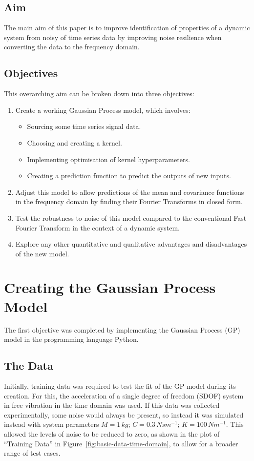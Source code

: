 \documentclass[12pt]{article}
\begin{document}
    \subsection{Aim}
    The main aim of this paper is to improve identification of properties of a dynamic system from noisy of time series data by improving noise resilience when converting the data to the frequency domain.

    \subsection{Objectives}
    This overarching aim can be broken down into three objectives:
        \begin{enumerate}
            \item Create a working Gaussian Process model, which involves:
                \begin{itemize}
                    \item Sourcing some time series signal data.
                    \item Choosing and creating a kernel.
                    \item Implementing optimisation of kernel hyperparameters. \label{item:nll}
                    \item Creating a prediction function to predict the outputs of new inputs. \label{item:predict}
                \end{itemize}
            \item Adjust this model to allow predictions of the mean and covariance functions in the frequency domain by finding their Fourier Transforms in closed form. \label{item:FT}
            \item Test the robustness to noise of this model compared to the conventional Fast Fourier Transform in the context of a dynamic system. \label{noise-resilience}
            \item Explore any other quantitative and qualitative advantages and disadvantages of the new model.
        \end{enumerate}

    \section{Creating the Gaussian Process Model}
    The first objective was completed by implementing the Gaussian Process (GP) model in the programming language Python.
    \subsection{The Data}
    Initially, training data was required to test the fit of the GP model during its creation.
    For this, the acceleration of a single degree of freedom (SDOF) system in free vibration in the time domain was used.
    If this data was collected experimentally, some noise would always be present, so instead it was simulated instead with system parameters $M = 1 \, kg$; $C = 0.3 \, Nsm^{-1}$; $K = 100 \, Nm^{-1}$.
    This allowed the levels of noise to be reduced to zero, as shown in the plot of ``Training Data'' in Figure~\ref{fig:basic-data-time-domain}, to allow for a broader range of test cases.
\end{document}

